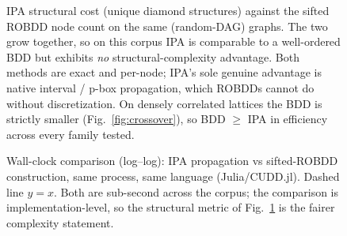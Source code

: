 \begin{figure}[t]\centering
{}
\caption{IPA structural cost (unique diamond structures) against the sifted ROBDD node count on the same
(random-DAG) graphs. The two grow together, so on this corpus IPA is comparable to a well-ordered BDD but
exhibits \emph{no} structural-complexity advantage. Both methods are exact and per-node; IPA's sole
genuine advantage is native interval / p-box propagation, which ROBDDs cannot do without discretization.
On densely correlated lattices the BDD is strictly smaller (Fig.~\ref{fig:crossover}), so BDD $\ge$ IPA in
efficiency across every family tested.}
\label{fig:ipa-vs-bdd}
\end{figure}

\begin{figure}[t]\centering
{}
\caption{Wall-clock comparison (log--log): IPA propagation vs sifted-ROBDD construction, same process,
same language (Julia/CUDD.jl). Dashed line $y=x$. Both are sub-second across the corpus; the comparison is
implementation-level, so the structural metric of Fig.~\ref{fig:ipa-vs-bdd} is the fairer complexity
statement.}
\label{fig:timing}
\end{figure}
